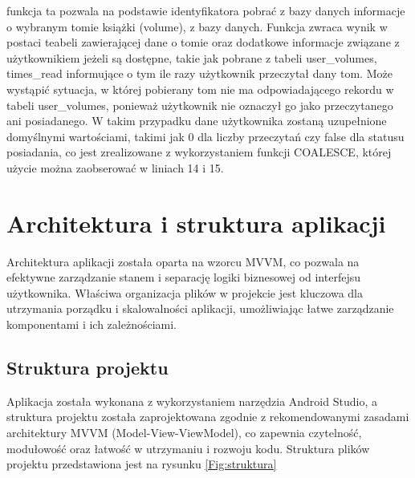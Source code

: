 \documentclass[12pt,twoside]{article}
\begin{document}
funkcja ta pozwala na podstawie identyfikatora pobrać z bazy danych informacje o wybranym tomie książki (volume), z bazy
danych. Funkcja zwraca wynik w postaci teabeli zawierającej dane o tomie oraz dodatkowe informacje związane z użytkownikiem
jeżeli są dostępne, takie jak pobrane z tabeli user\_volumes, times\_read informujące o tym ile razy użytkownik przeczytał
dany tom. Może wystąpić sytuacja, w której pobierany tom nie ma odpowiadającego rekordu w tabeli user\_volumes, ponieważ 
użytkownik nie oznaczył go jako przeczytanego ani posiadanego. W takim przypadku dane użytkownika zostaną uzupełnione 
domyślnymi wartościami, takimi jak 0 dla liczby przeczytań czy false dla statusu posiadania, co jest zrealizowane z 
wykorzystaniem funkcji COALESCE, której użycie można zaobserować w liniach 14 i 15.

\clearpage

\section{Architektura i struktura aplikacji}

Architektura aplikacji została oparta na wzorcu MVVM, co pozwala na efektywne zarządzanie stanem i separację 
logiki biznesowej od interfejsu użytkownika. Właściwa organizacja plików w projekcie jest kluczowa dla 
utrzymania porządku i skalowalności aplikacji, umożliwiając łatwe zarządzanie komponentami i ich zależnościami. 

\subsection{Struktura projektu}

Aplikacja została wykonana z wykorzystaniem narzędzia Android Studio, a struktura projektu została zaprojektowana 
zgodnie z rekomendowanymi zasadami architektury MVVM (Model-View-ViewModel), co zapewnia czytelność, modułowość
oraz łatwość w utrzymaniu i rozwoju kodu. Struktura plików projektu przedstawiona jest na rysunku \ref{Fig:struktura}
\end{document}
